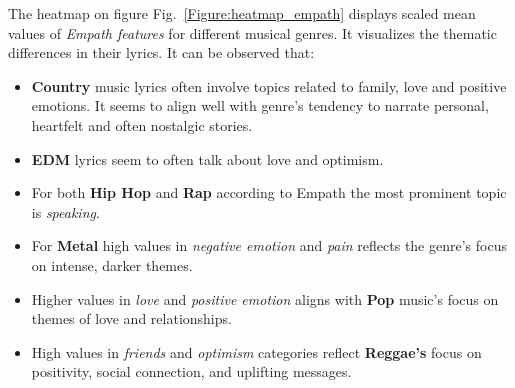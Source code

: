 The heatmap on figure Fig.~\ref{Figure:heatmap_empath} displays scaled mean
values of \textit{Empath features} for different musical genres. It visualizes
the thematic  differences in their lyrics. It can be observed that:
\begin{itemize}
  \item \textbf{Country} music lyrics often involve topics related to family,
    love and  positive emotions. It seems to align well with genre's tendency
    to narrate personal, heartfelt and often nostalgic stories.
  \item \textbf{EDM} lyrics seem to often talk about love and optimism.
  \item For both \textbf{Hip Hop} and \textbf{Rap} according to Empath  the
    most prominent topic is \textit{speaking}.
  \item For \textbf{Metal} high values in \textit{negative emotion} and
    \textit{pain} reflects the genre's focus on intense, darker themes.
  \item Higher values in \textit{love} and \textit{positive emotion}
    aligns with \textbf{Pop} music’s focus on themes of love and relationships.
  \item High values in \textit{friends} and \textit{optimism} categories
    reflect \textbf{Reggae's} focus on positivity, social connection, and
    uplifting messages.
\end{itemize}


